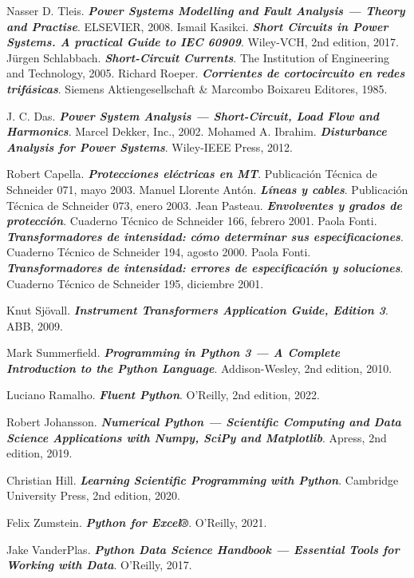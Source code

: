 \begin{thebibliography}{99}
     Nasser D. Tleis. \textbf{\textit{Power Systems Modelling and Fault Analysis --- Theory and Practise}}.  ELSEVIER, 2008.
     Ismail Kasikci. \textbf{\textit{Short Circuits in Power Systems. A practical Guide to IEC 60909}}.  Wiley-VCH, 2nd edition, 2017.
     Jürgen Schlabbach. \textbf{\textit{Short-Circuit Currents}}.  The Institution of Engineering and Technology, 2005.
     Richard Roeper. \textbf{\textit{Corrientes de cortocircuito en redes trifásicas}}.  Siemens Aktiengesellschaft \& Marcombo Boixareu Editores, 1985.

     J. C. Das. \textbf{\textit{Power System Analysis --- Short-Circuit, Load Flow and Harmonics}}. Marcel Dekker, Inc., 2002.
     Mohamed A. Ibrahim. \textbf{\textit{Disturbance Analysis for Power Systems}}. Wiley-IEEE Press, 2012.

     Robert Capella. \textbf{\textit{Protecciones eléctricas en MT}}.  Publicación Técnica de Schneider 071, mayo 2003.
     Manuel Llorente Antón. \textbf{\textit{Líneas y cables}}.  Publicación Técnica de Schneider 073, enero 2003.
     Jean Pasteau. \textbf{\textit{Envolventes y grados de protección}}.  Cuaderno Técnico de Schneider 166, febrero 2001.
     Paola Fonti. \textbf{\textit{Transformadores de intensidad: cómo determinar sus especificaciones}}.  Cuaderno Técnico de Schneider 194, agosto 2000.
     Paola Fonti. \textbf{\textit{Transformadores de intensidad: errores de especificación y soluciones}}.  Cuaderno Técnico de Schneider 195, diciembre 2001.

     Knut Sjövall. \textbf{\textit{Instrument Transformers Application Guide, Edition 3}}.  ABB, 2009.
    
     Mark Summerfield. \textbf{\textit{Programming in Python 3 --- A Complete Introduction to the Python Language}}.  Addison-Wesley, 2nd edition, 2010.
    
     Luciano Ramalho. \textbf{\textit{Fluent Python}}.  O'Reilly, 2nd edition, 2022.
    	
     Robert Johansson. \textbf{\textit{Numerical
    		Python --- Scientific Computing and Data Science Applications with Numpy,
    		SciPy and Matplotlib}}.  Apress, 2nd edition, 2019.
    
     Christian Hill. \textbf{\textit{Learning Scientific Programming with Python}}.  Cambridge University Press, 2nd edition,  2020.
    
      Felix Zumstein. \textbf{\textit{Python for Excel®}}.  O'Reilly, 2021.
        
      Jake VanderPlas. \textbf{\textit{Python Data Science Handbook --- Essential Tools for Working with Data}}.  O'Reilly, 2017.

\end{thebibliography}
